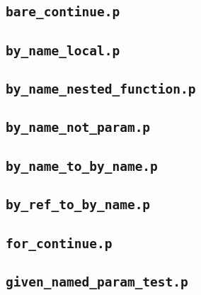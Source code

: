 \documentclass[a4paper,9pt]{article}
\begin{document}
\begin{multicols}{2}

\subsection{\textbf{\texttt{bare\_continue.p}}}


\subsection{\textbf{\texttt{by\_name\_local.p}}}


\subsection{\textbf{\texttt{by\_name\_nested\_function.p}}}


\subsection{\textbf{\texttt{by\_name\_not\_param.p}}}


\subsection{\textbf{\texttt{by\_name\_to\_by\_name.p}}}


\subsection{\textbf{\texttt{by\_ref\_to\_by\_name.p}}}


\subsection{\textbf{\texttt{for\_continue.p}}}


\subsection{\textbf{\texttt{given\_named\_param\_test.p}}}



\end{multicols}
\end{document}
